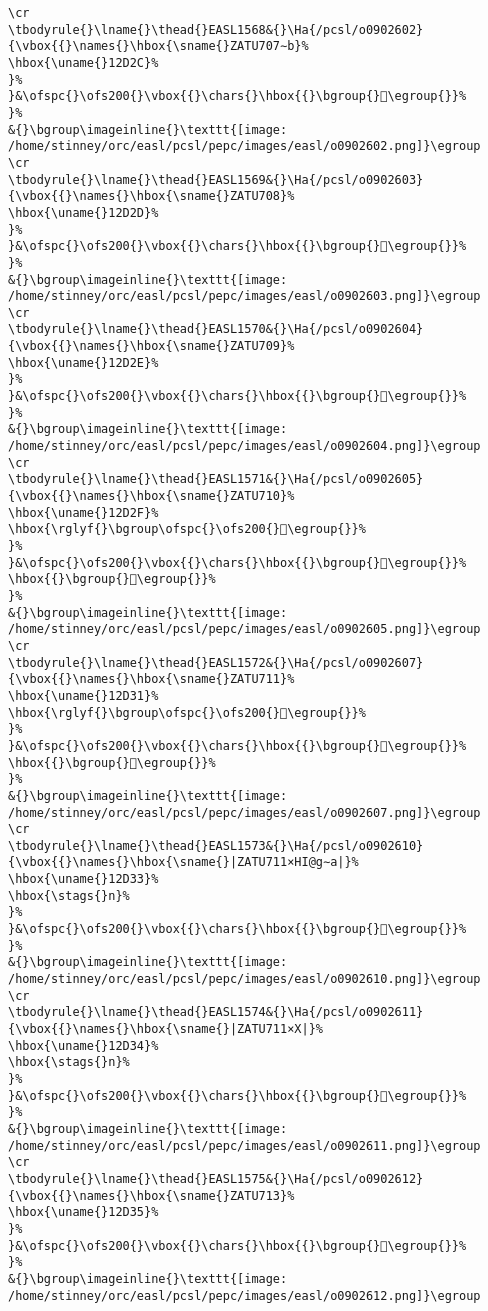 \begin{verbatim}
\cr
\tbodyrule{}\lname{}\thead{}EASL1568&{}\Ha{/pcsl/o0902602}{\vbox{{}\names{}\hbox{\sname{}ZATU707∼b}%
\hbox{\uname{}12D2C}%
}%
}&\ofspc{}\ofs200{}\vbox{{}\chars{}\hbox{{}\bgroup{}𒴬\egroup{}}%
}%
&{}\bgroup\imageinline{}\texttt{[image: /home/stinney/orc/easl/pcsl/pepc/images/easl/o0902602.png]}\egroup
\cr
\tbodyrule{}\lname{}\thead{}EASL1569&{}\Ha{/pcsl/o0902603}{\vbox{{}\names{}\hbox{\sname{}ZATU708}%
\hbox{\uname{}12D2D}%
}%
}&\ofspc{}\ofs200{}\vbox{{}\chars{}\hbox{{}\bgroup{}𒴭\egroup{}}%
}%
&{}\bgroup\imageinline{}\texttt{[image: /home/stinney/orc/easl/pcsl/pepc/images/easl/o0902603.png]}\egroup
\cr
\tbodyrule{}\lname{}\thead{}EASL1570&{}\Ha{/pcsl/o0902604}{\vbox{{}\names{}\hbox{\sname{}ZATU709}%
\hbox{\uname{}12D2E}%
}%
}&\ofspc{}\ofs200{}\vbox{{}\chars{}\hbox{{}\bgroup{}𒴮\egroup{}}%
}%
&{}\bgroup\imageinline{}\texttt{[image: /home/stinney/orc/easl/pcsl/pepc/images/easl/o0902604.png]}\egroup
\cr
\tbodyrule{}\lname{}\thead{}EASL1571&{}\Ha{/pcsl/o0902605}{\vbox{{}\names{}\hbox{\sname{}ZATU710}%
\hbox{\uname{}12D2F}%
\hbox{\rglyf{}\bgroup\ofspc{}\ofs200{}𒴯\egroup{}}%
}%
}&\ofspc{}\ofs200{}\vbox{{}\chars{}\hbox{{}\bgroup{}𒴯\egroup{}}%
\hbox{{}\bgroup{}𒴰\egroup{}}%
}%
&{}\bgroup\imageinline{}\texttt{[image: /home/stinney/orc/easl/pcsl/pepc/images/easl/o0902605.png]}\egroup
\cr
\tbodyrule{}\lname{}\thead{}EASL1572&{}\Ha{/pcsl/o0902607}{\vbox{{}\names{}\hbox{\sname{}ZATU711}%
\hbox{\uname{}12D31}%
\hbox{\rglyf{}\bgroup\ofspc{}\ofs200{}𒴱\egroup{}}%
}%
}&\ofspc{}\ofs200{}\vbox{{}\chars{}\hbox{{}\bgroup{}𒴲\egroup{}}%
\hbox{{}\bgroup{}𒴱\egroup{}}%
}%
&{}\bgroup\imageinline{}\texttt{[image: /home/stinney/orc/easl/pcsl/pepc/images/easl/o0902607.png]}\egroup
\cr
\tbodyrule{}\lname{}\thead{}EASL1573&{}\Ha{/pcsl/o0902610}{\vbox{{}\names{}\hbox{\sname{}|ZATU711×HI@g∼a|}%
\hbox{\uname{}12D33}%
\hbox{\stags{}n}%
}%
}&\ofspc{}\ofs200{}\vbox{{}\chars{}\hbox{{}\bgroup{}𒴳\egroup{}}%
}%
&{}\bgroup\imageinline{}\texttt{[image: /home/stinney/orc/easl/pcsl/pepc/images/easl/o0902610.png]}\egroup
\cr
\tbodyrule{}\lname{}\thead{}EASL1574&{}\Ha{/pcsl/o0902611}{\vbox{{}\names{}\hbox{\sname{}|ZATU711×X|}%
\hbox{\uname{}12D34}%
\hbox{\stags{}n}%
}%
}&\ofspc{}\ofs200{}\vbox{{}\chars{}\hbox{{}\bgroup{}𒴴\egroup{}}%
}%
&{}\bgroup\imageinline{}\texttt{[image: /home/stinney/orc/easl/pcsl/pepc/images/easl/o0902611.png]}\egroup
\cr
\tbodyrule{}\lname{}\thead{}EASL1575&{}\Ha{/pcsl/o0902612}{\vbox{{}\names{}\hbox{\sname{}ZATU713}%
\hbox{\uname{}12D35}%
}%
}&\ofspc{}\ofs200{}\vbox{{}\chars{}\hbox{{}\bgroup{}𒴵\egroup{}}%
}%
&{}\bgroup\imageinline{}\texttt{[image: /home/stinney/orc/easl/pcsl/pepc/images/easl/o0902612.png]}\egroup

\end{verbatim}
